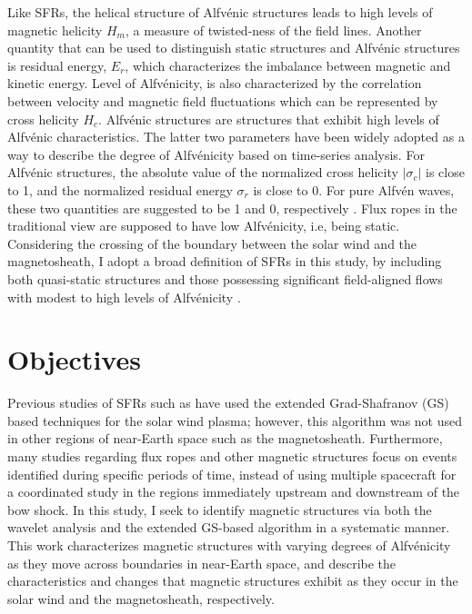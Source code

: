 Like SFRs, the helical structure of Alfv\'enic structures leads to high levels of magnetic helicity $H_m$\footnotemark{}, a measure of twisted-ness of the field lines. Another quantity that can be used to distinguish static structures and Alfv\'enic structures is residual energy, $E_r$\footnotemark[\value{footnote}], which characterizes the imbalance between magnetic and kinetic energy. Level of Alfv\'enicity, is also characterized by the correlation between velocity and magnetic field fluctuations which can be represented by cross helicity $H_c$\footnotemark[\value{footnote}]. Alfv\'enic structures are structures that exhibit high levels of Alfv\'enic characteristics. The latter two parameters have been widely adopted as a way to describe the degree of Alfv\'enicity based on time-series analysis. For Alfv\'enic structures, the absolute value of the normalized cross helicity $|\sigma_c|$ is close to 1, and the normalized residual energy $\sigma_r$ is close to 0. For pure Alfv\'en waves, these two quantities are suggested to be 1 and 0, respectively \citep{Bruno:2013}. Flux ropes in the traditional view are supposed to have low Alfv\'enicity, i.e, being static. Considering the crossing of the boundary between the solar wind and the magnetosheath, I adopt a broad definition of SFRs in this study, by including both quasi-static structures and those possessing significant field-aligned flows with modest to high levels of Alfv\'enicity \citep{Chen:2022}.



\section{Objectives}
Previous studies of SFRs such as \cite{Chen:2022} have used the extended Grad-Shafranov (GS) based techniques for the solar wind plasma; however, this algorithm was not used in other regions of near-Earth space such as the magnetosheath. Furthermore, many studies regarding flux ropes and other magnetic structures \citep{Zhao:2020, Chen:2021} focus on events identified during specific periods of time, instead of using multiple spacecraft for a coordinated study in the regions immediately upstream and downstream of the bow shock. In this study, I seek to identify magnetic structures via both the wavelet analysis and the extended GS-based algorithm in a systematic manner. This work characterizes magnetic structures with varying degrees of Alfv\'enicity as they move across boundaries in near-Earth space, and describe the characteristics and changes that magnetic structures exhibit as they occur in the solar wind and the magnetosheath, respectively.  

